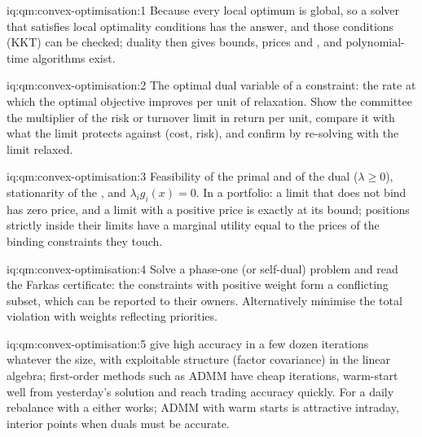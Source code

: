 \begin{solution}{iq:qm:convex-optimisation:1}
Because every local optimum is global, so a solver that satisfies local optimality conditions has the answer, and those conditions (KKT) can be checked; duality then gives bounds, prices
and , and polynomial-time algorithms exist.
\end{solution}

\begin{solution}{iq:qm:convex-optimisation:2}
The optimal dual variable of a constraint: the rate at which the optimal objective improves per unit of relaxation. Show the committee the multiplier of the risk or turnover limit in return per
unit, compare it with what the limit protects against (cost, risk), and confirm by re-solving with the limit relaxed.
\end{solution}

\begin{solution}{iq:qm:convex-optimisation:3}
Feasibility of the primal and of the dual ($\lambda \ge 0$), stationarity of the , and $\lambda_ig_i(x) = 0$. In a portfolio: a limit that does not bind has zero price, and a limit with a positive price
is exactly at its bound; positions strictly inside their limits have a marginal utility equal to the prices of the binding constraints they touch.
\end{solution}

\begin{solution}{iq:qm:convex-optimisation:4}
Solve a phase-one (or self-dual) problem and read the Farkas certificate: the constraints with positive weight form a conflicting subset, which can be reported to their owners. Alternatively
minimise the total violation with weights reflecting priorities.
\end{solution}

\begin{solution}{iq:qm:convex-optimisation:5}
 give high accuracy in a few dozen iterations whatever the size, with exploitable structure (factor covariance) in the linear algebra; first-order methods such as ADMM have
cheap iterations, warm-start well from yesterday's solution and reach trading accuracy quickly. For a daily rebalance with a  either works; ADMM with warm starts is attractive
intraday, interior points when duals must be accurate.
\end{solution}

